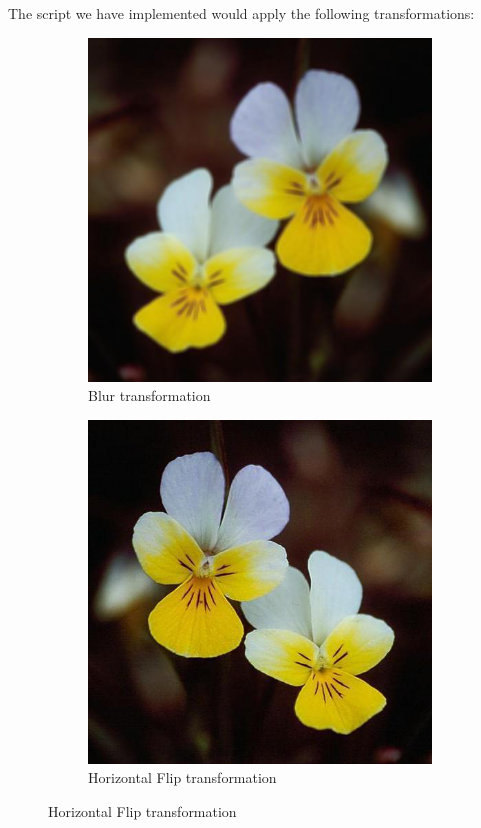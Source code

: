\documentclass[11]{article}
\begin{document}
The script we have implemented would apply the following transformations: 

\begin{figure}[H]
    \begin{subfigure}[t]{0.45\textwidth}
    \centering
  \includegraphics[scale=0.25]{images/blur.jpg}
    \caption{Blur transformation}
    \label{blur}
    \end{subfigure}
    \begin{subfigure}[t]{0.45\textwidth}
    \centering
    \includegraphics[scale=0.25]{images/horizontal.jpg}
    \caption{Horizontal Flip transformation}
    \label{horizontalflip}
    \end{subfigure}
\end{figure}
\end{document}

